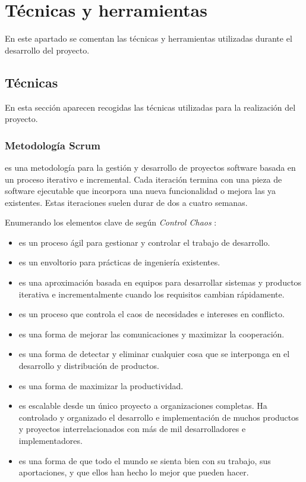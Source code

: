 \chapter{Técnicas y herramientas}

En este apartado se comentan las técnicas y herramientas utilizadas durante el desarrollo del proyecto.



\section{Técnicas}
En esta sección aparecen recogidas las técnicas utilizadas para la realización del proyecto.


\subsection{Metodología Scrum}
\scrum{}  es una metodología para la gestión y desarrollo de proyectos software basada en un proceso iterativo e incremental. Cada iteración termina con una pieza de software ejecutable que incorpora una nueva funcionalidad o mejora las ya existentes. Estas iteraciones suelen durar de dos a cuatro semanas.

Enumerando los elementos clave de \scrum{} según \textit{Control Chaos} :
\begin{itemize}
 \item \scrum{} es un proceso ágil para gestionar y controlar el trabajo de desarrollo.
 \item \scrum{} es un envoltorio para prácticas de ingeniería existentes.
 \item \scrum{} es una aproximación basada en equipos para desarrollar sistemas y productos iterativa e incrementalmente cuando los requisitos cambian rápidamente.
 \item \scrum{} es un proceso que controla el caos de necesidades e intereses en conflicto.
 \item \scrum{} es una forma de mejorar las comunicaciones y maximizar la cooperación.
 \item \scrum{} es una forma de detectar y eliminar cualquier cosa que se interponga en el desarrollo y distribución de productos.
 \item \scrum{} es una forma de maximizar la productividad.
 \item \scrum{} es escalable desde un único proyecto a organizaciones completas. Ha controlado y organizado el desarrollo e implementación de muchos   productos y proyectos interrelacionados con más de mil desarrolladores e implementadores.
 \item \scrum{} es una forma de que todo el mundo se sienta bien con su trabajo, sus aportaciones, y que ellos han hecho lo mejor que pueden hacer.
\end{itemize}

